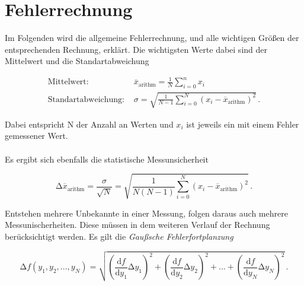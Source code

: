 \section{Fehlerrechnung}
\label{sec:Fehlerrechnung}

Im Folgenden wird die allgemeine Fehlerrechnung, und alle wichtigen Größen der entsprechenden Rechnung, erklärt.
Die wichtigsten Werte dabei sind der Mittelwert und die Standartabweichung

\begin{align}
    \text{Mittelwert:} & \stackrel{_{-}}{x}_{\text{arithm}}  = \frac{1}{N} \sum_{i=0}^{n} x_i \\
    \text{Standartabweichung: } & \sigma  = \sqrt{\frac{1}{N - 1 } \sum_{i=0}^{N} (x_i -  \stackrel{_{-}}{x}_{\text{arithm}})^2} \, .
\end{align}

Dabei entspricht N der Anzahl an Werten und $x_i$ ist jeweils ein mit einem Fehler gemessener Wert.\\
\\
Es ergibt sich ebenfalls die statistische Messunsicherheit

\begin{equation}
    \increment \stackrel{_{-}}{x}_{\text{arithm}} = \frac{\sigma}{\sqrt{N}} = 
    \sqrt{\frac{1}{N(N - 1)} \sum_{i=0}^{N} (x_i -  \stackrel{_{-}}{x}_{\text{arithm}})^2} \, .
\end{equation} 

Entstehen mehrere Unbekannte in einer Messung, folgen daraus auch mehrere Messunischerheiten.
Diese müssen in dem weiteren Verlauf der Rechnung berücksichtigt werden.
Es gilt die \textit{Gaußsche Fehlerfortplanzung}

\begin{equation}
    \increment f(y_1 ,y_2 ,...,y_N ) = \sqrt{\left(\frac{\text{d} f}{\text{d} y_{1}} \increment y_{1}\right)^2
    + \left(\frac{\text{d} f}{\text{d} y_{2}} \increment y_{2}\right)^2 + ... + 
    \left(\frac{\text{d} f}{\text{d} y_{N}} \increment y_{N}\right)^2
    } \, .
\end{equation}